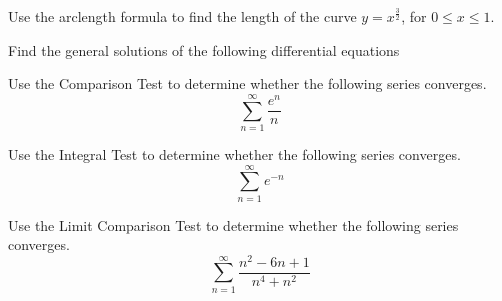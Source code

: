 \documentclass[11pt]{exam}
\begin{document}
\begin{questions}
\newpage
\addpoints
\question[2] Use the arclength formula to find the length of the curve $y=x^\frac{3}{2}$, for $0 \leq x \leq 1$.

\newpage
\addpoints
\question Find the general solutions of the following differential equations
\newpage
\addpoints
\question[1] Use the Comparison Test to determine whether the following series converges. 
\begin{equation*}
\sum_{n=1}^{\infty} \frac{e^n}{n}
\end{equation*}

\newpage 
\addpoints
\question[1] Use the Integral Test to determine whether the following series converges. 
\begin{equation*}
\sum_{n=1}^{\infty} e^{-n}
\end{equation*}


\newpage
\addpoints
\question[1] Use the Limit Comparison Test to determine whether the following series converges. 
\begin{equation*}
\sum_{n=1}^{\infty} \frac{n^2-6n+1}{n^4+n^2}
\end{equation*}


\end{questions}
\end{document}
